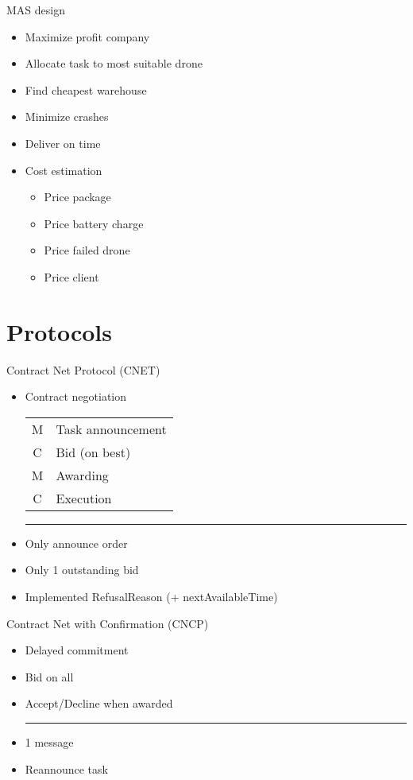 \documentclass{beamer}
\begin{document}
	\begin{frame}{MAS design}
		\begin{itemize}
			\item Maximize profit company
			\item Allocate task to most suitable drone
			\item Find cheapest warehouse
			\item Minimize crashes
			\item Deliver on time
			\item Cost estimation
				\begin{itemize}
				\item Price package
				\item Price battery charge
				\item Price failed drone
				\item Price client
				\end{itemize}
		\end{itemize}
	\end{frame}

	\section{Protocols}
	\begin{frame}{Contract Net Protocol (CNET)}
		\begin{itemize}
			\item Contract negotiation
			\linebreak
			\begin{tabular}{cl}
				M & Task announcement \\
				C & Bid (on best) \\
				M & Awarding \\
				C & Execution \\
			\end{tabular}
			\hrule
			\item Only announce order
			\item Only 1 outstanding bid
			\item Implemented RefusalReason (+ nextAvailableTime)
		\end{itemize}
	\end{frame}

	\begin{frame}{Contract Net with Confirmation (CNCP)}
		\begin{itemize}
			\item Delayed commitment
			\item Bid on all
			\item Accept/Decline when awarded
			\hrule
			\item 1 message
			\item Reannounce task
		\end{itemize}
	\end{frame}
\end{document}
